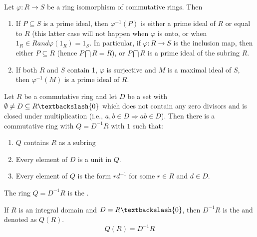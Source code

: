 \begin{proposition}
\\
Let $\varphi: R \rightarrow S$ be a ring isomorphism of commutative rings. Then
\begin{enumerate}[label=(\roman*)]
\item If $P \subseteq S$ is a prime ideal, then $\varphi^{-1}(P)$ is either a prime ideal of $R$ or equal to $R$ (this latter case will not happen when $\varphi$ is onto, or when $1_R \in R and \varphi(1_R) = 1_S$. In particular, if $\varphi : R \rightarrow S$ is the inclusion map, then either $P \subseteq R$ (hence $P \bigcap R = R$), or $P \bigcap R$ is a prime ideal of the subring $R$.
\item If both $R$ and $S$ contain 1, $\varphi$ is surjective and $M$ is a maximal ideal of $S$, then $\varphi^{-1}(M)$ is a prime ideal of $R$.
\end{enumerate}
\end{proposition}


\begin{theorem}
Let $R$ be a commutative ring and let $D$ be a set with $\emptyset \neq D \subseteq R \textbackslash \{0\}$ which does not contain any zero divisors and is closed under multiplication (i.e., $a, b \in D \Rightarrow ab \in D$). Then there is a commutative ring with $Q = D^{-1}R$ with $1$ such that:
\begin{enumerate}[label=(\roman*)]
\item $Q$ contains $R$ as a subring
\item Every element of $D$ is a unit in $Q$.
\item Every element of $Q$ is the form $r d^{-1}$ for some $r \in R$ and $d \in D$.
\end{enumerate}
\end{theorem}

\begin{definition}
The ring $Q = D^{-1}R$ is the .
\end{definition}

\begin{definition}
If $R$ is an integral domain and $D = R \textbackslash \{0\}$, then $D ^ {-1}R$ is the  and denoted as $Q(R)$.
\begin{equation}
Q(R) = D ^{-1}R \nonumber
\end{equation}
\end{definition}


